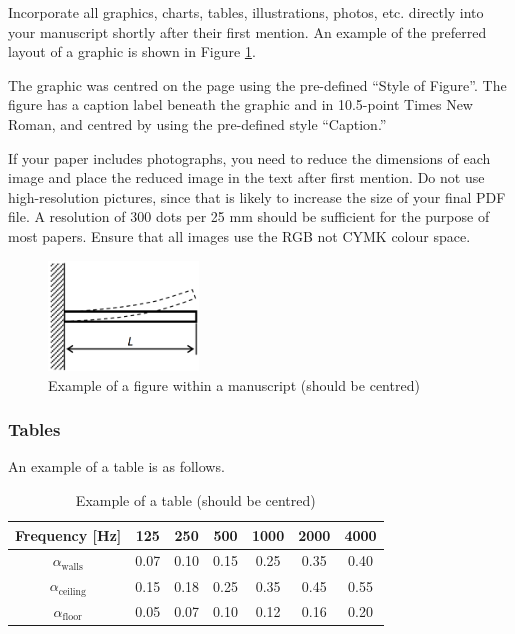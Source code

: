 Incorporate all graphics, charts, tables, illustrations, photos, etc. directly into your manuscript shortly after their first mention. An example of the preferred layout of a graphic is shown in Figure \ref{fig:figure1}.

The graphic was centred on the page using the pre-defined ``Style of Figure''. The figure has a caption label beneath the graphic and in 10.5-point Times New Roman, and centred by using the pre-defined style ``Caption.''

If your paper includes photographs, you need to reduce the dimensions of each image and place the reduced image in the text after first mention. Do not use high-resolution pictures, since that is likely to increase the size of your final PDF file. A resolution of 300 dots per 25 mm should be sufficient for the purpose of most papers. Ensure that all images use the RGB not CYMK colour space.

\begin{figure}[ht!]
\centering
\includegraphics[width=4cm]{figureICA.png}
\caption{Example of a figure within a manuscript (should be centred)}
\label{fig:figure1}
\end{figure}

\subsubsection{Tables}

An example of a table is as follows.

\begin{table}[!ht]
\caption{Example of a table (should be centred)}
\label{tab:table1}
\begin{center}
\begin{tabular}{ccccccc}
\hline 
Frequency [Hz] & 125 & 250 & 500 & 1000 & 2000 & 4000\\ \hline
$\alpha_{\text{walls}}$ &	0.07&	0.10&	0.15&	0.25&	0.35&	0.40 \\ 
$\alpha_{\text{ceiling}}$&	0.15&	0.18&	0.25&	0.35&	0.45&	0.55\\ 
$\alpha_{\text{floor}}$	& 0.05&	0.07&	0.10&	0.12&	0.16&	0.20\\ \hline
\end{tabular} 
\end{center}
\end{table}

